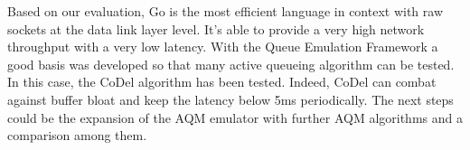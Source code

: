 Based on our evaluation, Go is the most efficient language in context with raw sockets at the data link layer level. It's able to provide a very high network throughput with a very low latency. With the Queue Emulation Framework a good basis was developed so that many active queueing algorithm can be tested. In this case, the CoDel algorithm has been tested. Indeed, CoDel can combat against buffer bloat and keep the latency below 5ms periodically. The next steps could be the expansion of the AQM emulator with further AQM algorithms and a comparison among them.